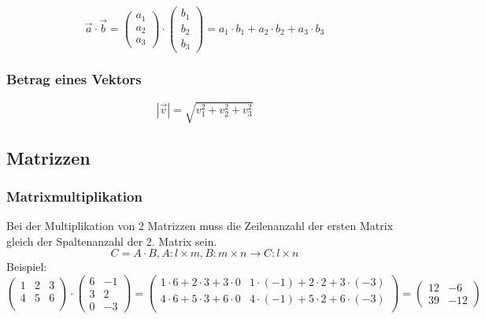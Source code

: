 \documentclass[a4paper,11pt]{article}
\begin{document}
	\begin{equation}
		\overrightarrow{a} \cdot \overrightarrow{b}
		= \left( \begin{array}{c} a_1\\a_2\\a_3\end{array}\right) \cdot \left( \begin{array}{c} b_1\\b_2\\b_3\end{array}\right)
		= a_1 \cdot b_1 + a_2 \cdot b_2 + a_3 \cdot b_3
	\end{equation}
	
	\subsubsection{Betrag eines Vektors}
	\label{ssub:betrag_eines_vektors}
	
	\begin{equation}
		|\overrightarrow{v}| = \sqrt{v_1^2 + v_2^2 + v_3^2}
	\end{equation}
	
	
	\subsection{Matrizzen} %
	\label{sub:matrizzen}
	
	\subsubsection{Matrixmultiplikation} 
	\label{ssub:matrixmultiplikation}
	
	Bei der Multiplikation von 2 Matrizzen muss die Zeilenanzahl der ersten Matrix gleich der Spaltenanzahl der 2. Matrix sein. 
	\begin{equation}
		C = A \cdot B, A : l \times m, B : m \times n \rightarrow C : l \times n
	\end{equation}
	Beispiel: 
	\begin{equation}
		\left(\begin{array}{ccc}1 & 2 & 3 \\4 & 5 & 6 \\\end{array}\right) \cdot
		\left(\begin{array}{cc}6 & -1 \\3 & 2 \\0 & -3\end{array}\right)
		=\left(\begin{array}{cc}1 \cdot 6  +  2 \cdot 3  +  3 \cdot 0 &
		  1 \cdot (-1) +  2 \cdot 2 +  3 \cdot (-3) \\4 \cdot 6  +  5 \cdot 3  +  6 \cdot 0 &
		  4 \cdot (-1) +  5 \cdot 2 +  6 \cdot (-3) \\\end{array}\right)
		=\left(\begin{array}{cc}12 & -6 \\39 & -12\end{array}\right)
	\end{equation}
	
\end{document}
